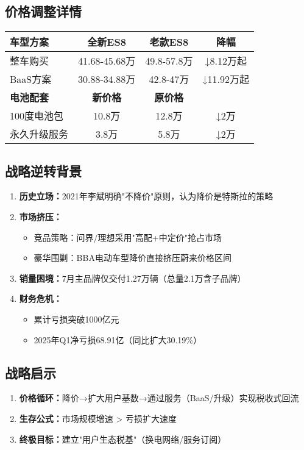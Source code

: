 \subsection{价格调整详情}
\begin{center}
\begin{tabular}{|l|c|c|c|}
\hline
\textbf{车型方案} & \textbf{全新ES8} & \textbf{老款ES8} & \textbf{降幅} \\
\hline
整车购买 & 41.68-45.68万 & 49.8-57.8万 & ↓8.12万起 \\
\hline
BaaS方案 & 30.88-34.88万 & 42.8-47万 & ↓11.92万起 \\
\hline
\textbf{电池配套} & \textbf{新价格} & \textbf{原价格} & \\
\hline
100度电池包 & 10.8万 & 12.8万 & ↓2万 \\
\hline
永久升级服务 & 3.8万 & 5.8万 & ↓2万 \\
\hline
\end{tabular}
\end{center}

\subsection{战略逆转背景}
\begin{enumerate}
    \item \textbf{历史立场：}2021年李斌明确"不降价"原则，认为降价是特斯拉的策略
    \item \textbf{市场挤压：}
    \begin{itemize}
        \item 竞品策略：问界/理想采用"高配+中定价"抢占市场
        \item 豪华围剿：BBA电动车型降价直接挤压蔚来价格区间
    \end{itemize}
    \item \textbf{销量困境：}7月主品牌仅交付1.27万辆（总量2.1万含子品牌）
    \item \textbf{财务危机：}
    
\begin{itemize}
        \item 累计亏损突破1000亿元
        \item 2025年Q1净亏损68.91亿（同比扩大30.19\%）
    \end{itemize}
\end{enumerate}

\subsection{战略启示}
    \begin{enumerate}
        \item \textbf{价格循环：}降价→扩大用户基数→通过服务（BaaS/升级）实现税收式回流
        \item \textbf{生存公式：}市场规模增速 > 亏损扩大速度
        \item \textbf{终极目标：}建立"用户生态税基"（换电网络/服务订阅）
    \end{enumerate}

    
